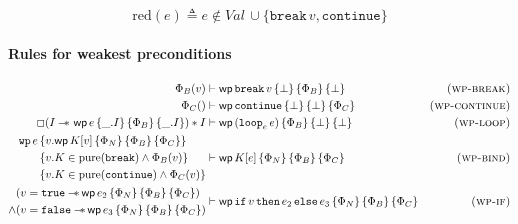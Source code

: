 \documentclass{article}
\numberwithin{algorithm}{section}
\newcommand{\progspec}[1]{\{ #1 \}}
\newcommand{\true}{\texttt{true}}
\newcommand{\false}{\texttt{false}}
\newcommand{\cloop}[1]{\texttt{loop}_{#1}\,}
\newcommand{\cbreak}{\texttt{break}\,}
\newcommand{\ccontinue}{\texttt{continue}}
\newcommand{\cif}{\texttt{if}\,}
\newcommand{\cthen}{\,\texttt{then}\,}
\newcommand{\celse}{\,\texttt{else}\,}
\newcommand{\pure}[1]{\text{pure}(#1)}
\newcommand{\cred}{\text{red}}
\newcommand{\wand}{-\mkern-8mu*\,}
\newcommand{\wpre}[4]{\textsf{wp}\, #1\, \progspec{#2}\, \progspec{#3}\, \progspec{#4}}
\begin{document}
$$
\cred(e) \triangleq e \notin \textit{Val}\, \cup \{\cbreak v, \ccontinue\}
$$

\paragraph{Rules for weakest preconditions}

$$
\begin{aligned}
    \Phi_B(v) &\vdash \wpre{\cbreak v}{\bot}{\Phi_B}{\bot} & \textsc{(wp-break)} \\
    \Phi_C() &\vdash \wpre{\ccontinue}{\bot}{\bot}{\Phi_C} & \textsc{(wp-continue)} \\
    \Box(I \wand{}\, \wpre{e}{\_. I}{\Phi_B}{\_. I}) * I &\vdash \wpre{(\cloop{e}e)}{\Phi_B}{\bot}{\bot} & \textsc{(wp-loop)} \\
    \begin{aligned}
        \texttt{wp}\,e\,& \progspec{v. \wpre{K[v]}{\Phi_N}{\Phi_B}{\Phi_C}} \\
                        & \progspec{v. K \in \pure{\cbreak\!} \land \Phi_B(v)} \\
                        & \progspec{v. K \in \pure{\ccontinue} \land \Phi_C(v)}
    \end{aligned} &\vdash \wpre{K[e]}{\Phi_N}{\Phi_B}{\Phi_C} & \textsc{(wp-bind)} \\
    \begin{aligned}
        &(v = \true \wand \wpre{e_2}{\Phi_N}{\Phi_B}{\Phi_C}) \\
        \land &(v = \false \wand \wpre{e_3}{\Phi_N}{\Phi_B}{\Phi_C})
    \end{aligned} &\vdash \wpre{\cif v \cthen e_2 \celse e_3}{\Phi_N}{\Phi_B}{\Phi_C} & \textsc{(wp-if)}
\end{aligned}
$$
\end{document}
